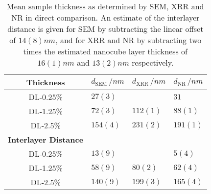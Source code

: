 \documentclass[\main/dresen_thesis.tex]{subfiles}
\begin{document}
  \begin{table}[!htbp]
    \centering
    \caption{\label{tab:doublelayers:ThicknessComparison}Mean sample thickness as determined by SEM, XRR and NR in direct comparison. An estimate of the interlayer distance is given for SEM by subtracting the linear offset of $14(8) \unit{nm}$, and for XRR and NR by subtracting two times the estimated nanocube layer thickness of $16(1) \unit{nm}$ and $13(2) \unit{nm}$ respectively.}
    \begin{tabular}{ c | l | l | l }
      \rule{0pt}{2ex} \textbf{Thickness}  & $d_\mathrm{SEM} \, / \unit{nm}$ & $d_\mathrm{XRR} \, / \unit{nm}$& $d_\mathrm{NR} \, / \unit{nm}$ \\
      \hline
      DL-0.25\%  & $27(3)$  &           & $31$\\
      DL-1.25\%  & $72(3)$  & $112(1)$  & $88(1)$\\
      DL-2.5\%   & $154(4)$ & $231(2)$  & $191(1)$\\
      \hline
      \rule{0pt}{2ex} \textbf{Interlayer Distance}\\
      \hline
      DL-0.25\%  & $13(9)$  &           & $5(4)$\\
      DL-1.25\%  & $58(9)$  & $80(2)$   & $62(4)$\\
      DL-2.5\%   & $140(9)$ & $199(3)$  & $165(4)$\\
      \hline
    \end{tabular}
  \end{table}
\end{document}
